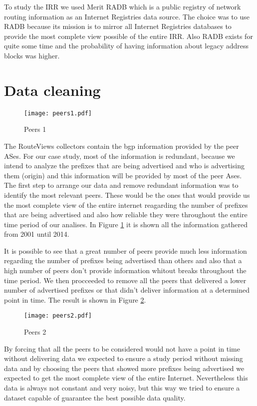 \documentclass[11pt,a4paper]{scrreprt}
\begin{document}
To study the IRR we used Merit RADB \cite{RADB} which is a public registry of network routing information as an Internet Registries data source. The choice was to use RADB because its mission is to mirror all Internet Registries  databases to provide the most complete view possible of the entire IRR. Also RADB exists for quite some time and the probability of having information about legacy address blocks was higher.  

\section{Data cleaning}

\begin{figure}[!h]
\centering
\texttt{[image: peers1.pdf]}
\caption{Peers 1}
\label{fig:peers1}
\end{figure}

The RouteViews collectors contain the bgp information provided by the peer ASes. For our case study, most of the information is redundant, because we intend to analyze the prefixes that are being advertised and who is advertising them (origin) and this information will be provided by most of the peer Ases. The first step to arrange our data and remove redundant information was to identify the most relevant peers. These would be the ones that would provide us the most complete view of the entire internet reagarding the number of prefixes that are being advertised and also how reliable they were throughout the entire time period of our analises. In Figure \ref{fig:peers1} it is shown all the information gathered from 2001 until 2014. 

It is possible to see that a great number of peers provide much less information regarding the number of prefixes being advertised than others and also that a high number of peers don't provide information whitout breaks throughout the time period. We then procceeded to remove all the peers that delivered a lower number of advertised prefixes or that didn't deliver information at a determined point in time. The result is shown in Figure \ref{fig:peers2}.  

\begin{figure}[!h]
\centering
\texttt{[image: peers2.pdf]}
\caption{Peers 2}
\label{fig:peers2}
\end{figure}

By forcing that all the peers to be considered would not have a point in time without delivering data we expected to ensure a study period without missing data and by choosing the peers that showed more prefixes being advertised we expected to get the most complete view of the entire Internet. Nevertheless this data is always not constant and very noisy, but this way we tried to ensure a dataset capable of guarantee the best possible data quality. 
\end{document}
